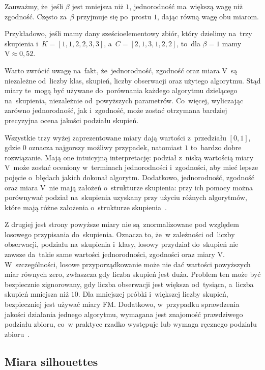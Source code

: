 \documentclass{praca1}
\begin{document}
Zauważmy, że~jeśli $\beta$ jest mniejsza niż $1$, jednorodność ma~większą wagę niż zgodność. Często za~$\beta$ przyjmuje się po~prostu $1$, dając równą wagę obu miarom.

Przykładowo, jeśli mamy dany sześcioelementowy zbiór, który dzielimy na~trzy skupienia i~$K = [1, 1, 2, 2, 3, 3]$, a~$C = [2, 1, 3, 1, 2, 2]$, to~dla $\beta = 1$ mamy $\textrm{V} \approx 0{,}52$.

Warto zwrócić uwagę na~fakt, że~jednorodność, zgodność oraz miara V~są niezależne od~liczby klas, skupień, liczby obserwacji oraz użytego algorytmu. Stąd miary te~mogą być używane do~porównania każdego algorytmu dzielącego na~skupienia, niezależnie od~powyższych parametrów. Co~więcej, wyliczając zarówno jednorodność, jak i~zgodność, może zostać otrzymana bardziej precyzyjna ocena jakości podziału skupień.


Wszystkie trzy wyżej zaprezentowane miary dają wartości z~przedziału $[0, 1]$, gdzie $0$ oznacza najgorszy możliwy przypadek, natomiast $1$ to~bardzo dobre rozwiązanie. Mają one intuicyjną interpretację: podział z~niską wartością miary V~może zostać oceniony w~terminach jednorodności i~zgodności, aby mieć lepsze pojęcie o~błędach jakich dokonał algorytm. Dodatkowo, jednorodność, zgodność oraz miara V~nie mają założeń o~strukturze skupienia: przy ich pomocy można porównywać podział na~skupienia uzyskany przy użyciu różnych algorytmów, które mają różne założenia o~strukturze skupienia~\cite{scikit}. 

Z drugiej jest strony powyższe miary nie są~znormalizowane pod względem losowego przypisania do~skupienia. Oznacza to, że~w zależności od~liczby obserwacji, podziału na~skupienia i~klasy, losowy przydział do~skupień nie zawsze da~takie same wartości jednorodności, zgodności oraz miary V. W~szczególności, losowe przyporządkowanie może nie dać wartości powyższych miar równych zero, zwłaszcza gdy liczba skupień jest duża. Problem ten może być bezpiecznie zignorowany, gdy liczba obserwacji jest większa od~tysiąca, a~liczba skupień mniejsza niż $10$. Dla mniejszej próbki i~większej liczby skupień, bezpieczniej jest używać miary FM.
Dodatkowo, w~przypadku sprawdzenia jakości działania jednego algorytmu, wymagana jest znajomość prawdziwego podziału zbioru, co~w praktyce rzadko występuje lub wymaga ręcznego podziału zbioru~\cite{scikit}.


\subsection{Miara silhouettes}
\end{document}

